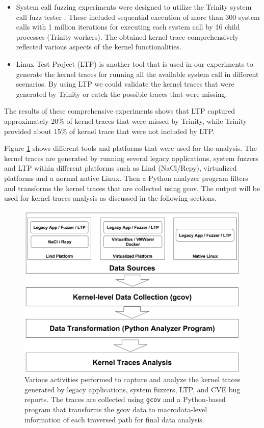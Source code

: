 \begin{itemize}
\item System call fuzzing experiments were designed to utilize the Trinity
 system call fuzz tester \cite{Trinity}. These included sequential execution of more than 300 system calls with 1 million iterations
 for executing each system call by 16 child processes (Trinity workers). The obtained kernel trace comprehensively reflected various aspects of the kernel functionalities.

\item Linux Test Project (LTP) \cite{LTP} is another tool that is used in our experiments to generate the kernel traces
for running all the available system call in different scenarios. By using LTP we could validate the kernel traces that
were generated by Trinity or catch the possible traces that were missing.

\end{itemize}
The results of these comprehensive experiments shows that LTP captured approximately 20\% of kernel traces that were missed by Trinity,
while Trinity provided about 15\% of kernel trace that were not included by LTP.

Figure \ref{fig:datacollection} shows different tools and platforms that were used
 for the analysis. The kernel traces are generated by running several legacy
  applications, system fuzzers and LTP within different platforms such as
  Lind (NaCl/Repy), virtualized platforms and a normal native Linux. Then a Python
   analyzer program filters and transforms the kernel traces that are collected
    using gcov. The output will be used for kernel traces analysis as
    discussed in the following sections.

\begin{figure}%
\centering
\includegraphics[width=1.0\columnwidth]{diagram/data_collection.png}
\caption{Various activities performed to capture and analyze the kernel
 traces generated by legacy applications, system fuzzers, LTP, and CVE bug
 reports. The traces are collected using \texttt{gcov} and a Python-based
 program that transforms the gcov data to
 macrodata-level information of each traversed path for final data analysis.}

\label{fig:datacollection}
\end{figure}

